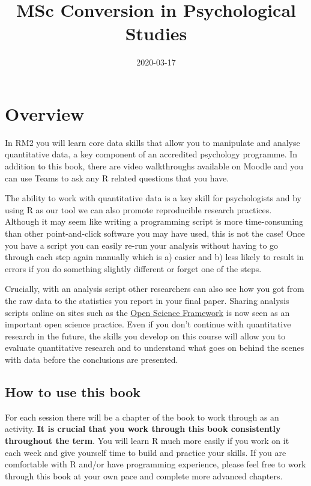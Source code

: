 \documentclass[]{book}
\title{MSc Conversion in Psychological Studies}
\author{}
\date{2020-03-17}
\begin{document}
\maketitle

{
\setcounter{tocdepth}{1}
\tableofcontents
}
\hypertarget{overview}{%
\chapter*{Overview}\label{overview}}

In RM2 you will learn core data skills that allow you to manipulate and analyse quantitative data, a key component of an accredited psychology programme. In addition to this book, there are video walkthroughs available on Moodle and you can use Teams to ask any R related questions that you have.

The ability to work with quantitative data is a key skill for psychologists and by using R as our tool we can also promote reproducible research practices. Although it may seem like writing a programming script is more time-consuming than other point-and-click software you may have used, this is not the case! Once you have a script you can easily re-run your analysis without having to go through each step again manually which is a) easier and b) less likely to result in errors if you do something slightly different or forget one of the steps.

Crucially, with an analysis script other researchers can also see how you got from the raw data to the statistics you report in your final paper. Sharing analysis scripts online on sites such as the \href{https://osf.io/}{Open Science Framework} is now seen as an important open science practice. Even if you don't continue with quantitative research in the future, the skills you develop on this course will allow you to evaluate quantitative research and to understand what goes on behind the scenes with data before the conclusions are presented.

\hypertarget{how-to-use-this-book}{%
\section{How to use this book}\label{how-to-use-this-book}}

For each session there will be a chapter of the book to work through as an activity. \textbf{It is crucial that you work through this book consistently throughout the term}. You will learn R much more easily if you work on it each week and give yourself time to build and practice your skills. If you are comfortable with R and/or have programming experience, please feel free to work through this book at your own pace and complete more advanced chapters.
\end{document}

